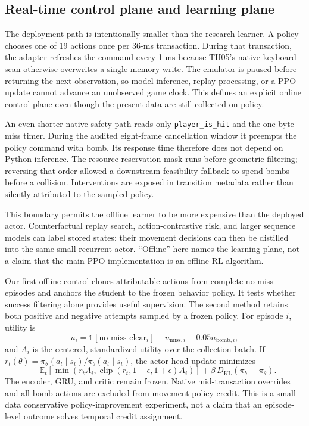 \documentclass[10pt]{article}
\begin{document}
\subsection{Real-time control plane and learning plane}

The deployment path is intentionally smaller than the research learner.  A
policy chooses one of 19 actions once per 36-ms transaction.  During that
transaction, the adapter refreshes the command every 1 ms because TH05's native
keyboard scan otherwise overwrites a single memory write.  The emulator is
paused before returning the next observation, so model inference, replay
processing, or a PPO update cannot advance an unobserved game clock.  This
defines an explicit online control plane even though the present data are still
collected on-policy.

An even shorter native safety path reads only \texttt{player\_is\_hit} and the
one-byte miss timer.  During the audited eight-frame cancellation window it
preempts the policy command with bomb.  Its response time therefore does not
depend on Python inference.  The resource-reservation mask runs before geometric
filtering; reversing that order allowed a downstream feasibility fallback to
spend bombs before a collision.  Interventions are exposed in transition
metadata rather than silently attributed to the sampled policy.

This boundary permits the offline learner to be more expensive than the
deployed actor.  Counterfactual replay search, action-contrastive risk, and
larger sequence models can label stored states; their movement decisions can
then be distilled into the same small recurrent actor.  ``Offline'' here names
the learning plane, not a claim that the main PPO implementation is an
offline-RL algorithm.

Our first offline control clones attributable actions from complete no-miss
episodes and anchors the student to the frozen behavior policy.  It tests
whether success filtering alone provides useful supervision.  The second
method retains both positive and negative attempts sampled by a frozen policy.
For episode $i$, utility is
\begin{equation}
  u_i = \mathbb{1}[\text{no-miss clear}_i] - n_{\mathrm{miss},i}
        - 0.05 n_{\mathrm{bomb},i},
\end{equation}
and $A_i$ is the centered, standardized utility over the collection batch.  If
$r_t(\theta)=\pi_\theta(a_t\mid s_t)/\pi_b(a_t\mid s_t)$, the actor-head update
minimizes
\begin{equation}
  -\mathbb{E}_t\!\left[\min\!\left(r_t A_i,
  \operatorname{clip}(r_t,1-\epsilon,1+\epsilon)A_i\right)\right]
  + \beta\,D_{\mathrm{KL}}(\pi_b\,\|\,\pi_\theta).
\end{equation}
The encoder, GRU, and critic remain frozen.  Native mid-transaction overrides
and all bomb actions are excluded from movement-policy credit.  This is a
small-data conservative policy-improvement experiment, not a claim that an
episode-level outcome solves temporal credit assignment.
\end{document}
